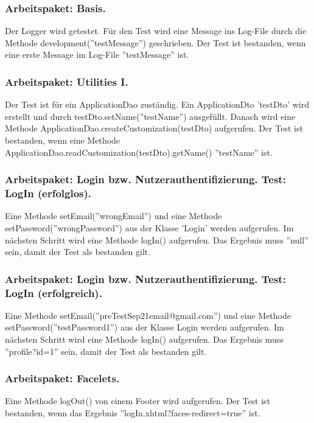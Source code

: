 \documentclass{article}
\begin{document}
\subsubsection{Arbeitspaket: Basis.}
Der Logger wird getestet. Für den Test wird eine Message ins Log-File durch die Methode development(''testMessage'') geschrieben. Der Test ist bestanden, wenn eine erste Message im Log-File ''testMessage'' ist.

\subsubsection{Arbeitspaket: Utilities I.}
Der Test ist für ein ApplicationDao zuständig. Ein ApplicationDto 'testDto' wird erstellt und durch testDto.setName(''testName'') ausgefüllt. Danach wird eine Methode \linebreak ApplicationDao.createCustomization(testDto) aufgerufen. Der Test ist bestanden, wenn eine Methode ApplicationDao.readCustomization(testDto).getName() ''testName'' ist.

\subsubsection{Arbeitspaket: Login bzw. Nutzerauthentifizierung. Test: LogIn (erfolglos).}
Eine Methode setEmail(''wrongEmail'') und eine Methode setPassword(''wrongPassword'') aus der Klasse 'Login' werden aufgerufen. Im nächsten Schritt wird eine Methode logIn() aufgerufen. Das Ergebnis muss ''null'' sein, damit der Test als bestanden gilt. 

\subsubsection{Arbeitspaket: Login bzw. Nutzerauthentifizierung. Test: LogIn (erfolgreich).}
Eine Methode setEmail(''preTestSep21email@gmail.com'') und eine Methode \linebreak setPassword(''testPassword1'') aus der Klasse Login werden aufgerufen. Im nächsten Schritt wird eine Methode logIn() aufgerufen. Das Ergebnis muss ''profile?id=1'' sein, damit der Test als bestanden gilt.

\subsubsection{Arbeitspaket: Facelets.}
Eine Methode logOut() von einem Footer wird aufgerufen. Der Test ist bestanden, wenn das Ergebnis ''logIn.xhtml?faces-redirect=true'' ist.
\end{document}

